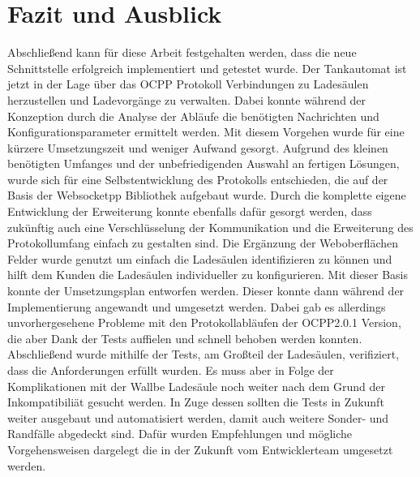 \section{Fazit und Ausblick}
Abschließend kann für diese Arbeit festgehalten werden, dass die neue Schnittstelle erfolgreich implementiert und getestet wurde. Der Tankautomat ist jetzt in der Lage über das OCPP Protokoll Verbindungen zu Ladesäulen herzustellen und Ladevorgänge zu verwalten. Dabei konnte während der Konzeption durch die Analyse der Abläufe die benötigten Nachrichten und Konfigurationsparameter ermittelt werden. Mit diesem Vorgehen wurde für eine kürzere Umsetzungszeit und weniger Aufwand gesorgt. Aufgrund des kleinen benötigten Umfanges und der unbefriedigenden Auswahl an fertigen Lösungen, wurde sich für eine Selbstentwicklung des Protokolls entschieden, die auf der Basis der Websocketpp Bibliothek aufgebaut wurde. Durch die komplette eigene Entwicklung der Erweiterung konnte ebenfalls dafür gesorgt werden, dass zukünftig auch eine Verschlüsselung der Kommunikation und die Erweiterung des Protokollumfang einfach zu gestalten sind. Die Ergänzung der Weboberflächen Felder wurde genutzt um einfach die Ladesäulen identifizieren zu können und hilft dem Kunden die Ladesäulen individueller zu konfigurieren. Mit dieser Basis konnte der Umsetzungsplan entworfen werden. Dieser konnte dann während der Implementierung angewandt und umgesetzt werden. Dabei gab es allerdings unvorhergesehene Probleme mit den Protokollabläufen der OCPP2.0.1 Version, die aber Dank der Tests auffielen und schnell behoben werden konnten. Abschließend wurde mithilfe der Tests, am Großteil der Ladesäulen, verifiziert, dass die Anforderungen erfüllt wurden. Es muss aber in Folge der Komplikationen mit der Wallbe Ladesäule noch weiter nach dem Grund der Inkompatibiliät gesucht werden. In Zuge dessen sollten die Tests in Zukunft weiter ausgebaut und automatisiert werden, damit auch weitere Sonder- und Randfälle abgedeckt sind. Dafür wurden Empfehlungen und mögliche Vorgehensweisen dargelegt die in der Zukunft vom Entwicklerteam umgesetzt werden. 
\newline

